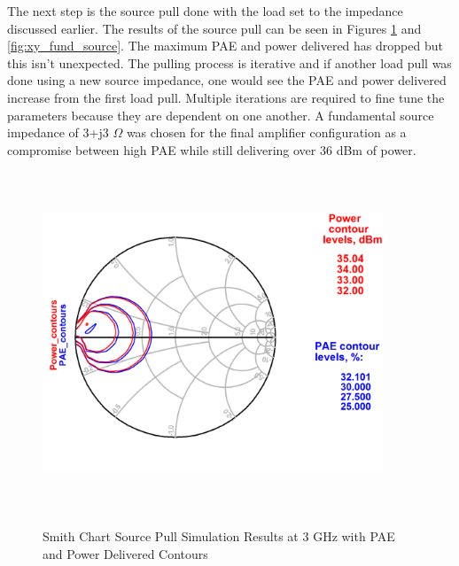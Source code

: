 
The next step is the source pull done with the load set to the impedance discussed earlier. The results of the source pull can be seen in Figures \ref{fig:smith_fund_source} and \ref{fig:xy_fund_source}. The maximum PAE and power delivered has dropped but this isn't unexpected. The pulling process is iterative and if another load pull was done using a new source impedance, one would see the PAE and power delivered increase from the first load pull. Multiple iterations are required to fine tune the parameters because they are dependent on one another. A fundamental source impedance of 3+j3 $\Omega$ was chosen for the final amplifier configuration as a compromise between high PAE while still delivering over 36 dBm of power.

\begin{figure}
  \centering
  \includegraphics[width=4in,height=4in,keepaspectratio]{figures/simulation/smith_fund_source}\\
  \caption{Smith Chart Source Pull Simulation Results at 3 GHz with PAE and Power Delivered Contours}
  \label{fig:smith_fund_source}

  \vspace*{\floatsep}


\end{figure}
